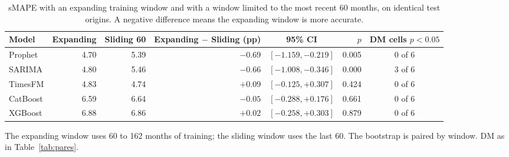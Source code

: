 \begin{table}[htbp]
\centering
\small
\setlength{\tabcolsep}{4pt}
\caption{sMAPE with an expanding training window and with a window limited to the most recent 60 months, on identical test origins. A negative difference means the expanding window is more accurate.}
\label{tab:janela}
\begin{tabular}{lrrrcrc}
\toprule
Model & Expanding & Sliding 60 & Expanding $-$ Sliding (pp) & 95\% CI & $p$ & DM cells $p<0.05$ \\
\midrule
Prophet & 4.70 & 5.39 & $-0.69$ & $[-1.159, -0.219]$ & 0.005 & 0 of 6 \\
SARIMA & 4.80 & 5.46 & $-0.66$ & $[-1.008, -0.346]$ & 0.000 & 3 of 6 \\
TimesFM & 4.83 & 4.74 & $+0.09$ & $[-0.125, +0.307]$ & 0.424 & 0 of 6 \\
CatBoost & 6.59 & 6.64 & $-0.05$ & $[-0.288, +0.176]$ & 0.661 & 0 of 6 \\
XGBoost & 6.88 & 6.86 & $+0.02$ & $[-0.258, +0.303]$ & 0.879 & 0 of 6 \\
\bottomrule
\end{tabular}

\vspace{0.5em}
\begin{minipage}{\textwidth}
\footnotesize
The expanding window uses 60 to 162 months of training; the sliding window uses the last 60. The bootstrap is paired by window. DM as in Table~\ref{tab:pares}.
\end{minipage}
\end{table}
